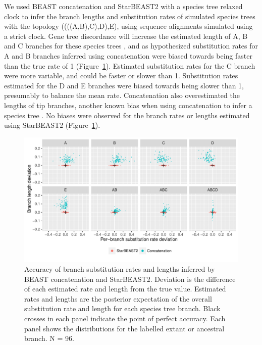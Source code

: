 \documentclass[nogrid]{MBE}%
\begin{document}
We used BEAST concatenation and StarBEAST2 with a species tree relaxed clock
to infer the branch lengths and substitution rates of simulated species trees
with the topology ((((A,B),C),D),E), using sequence alignments simulated using
a strict clock. Gene tree discordance will increase the estimated length of A,
B and C branches for these species trees \citep{Mendes01072016}, and as
hypothesized substitution rates for A and B branches inferred using
concatenation were biased towards being faster than the true rate of 1
(Figure~\ref{fig:spilsRates}). Estimated substitution rates for the C branch
were more variable, and could be faster or slower than 1. Substitution rates
estimated for the D and E branches were biased towards being slower than 1,
presumably to balance the mean rate. Concatenation also overestimated the
lengths of tip branches, another known bias when using concatenation to infer
a species tree \citep{Ogilvie01052016}. No biases were observed for the branch
rates or lengths estimated using StarBEAST2 (Figure~\ref{fig:spilsRates}).

\begin{figure}[htb!]
\centering
\includegraphics[width=\textwidth]{scatter.pdf}
\caption
{Accuracy of branch substitution rates and lengths inferred by BEAST
concatenation and StarBEAST2. Deviation is the difference of each estimated
rate and length from the true value. Estimated rates and lengths are the
posterior expectation of the overall substitution rate and length for each
species tree branch. Black crosses in each panel indicate the point of perfect
accuracy. Each panel shows the distributions for the labelled extant or
ancestral branch. N = 96.}
\label{fig:spilsRates}
\end{figure}
\end{document}
